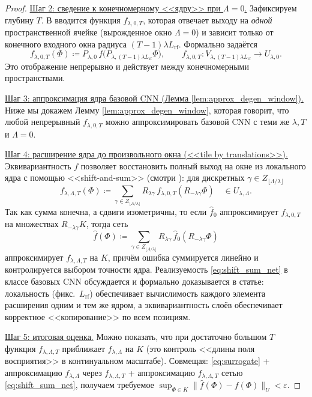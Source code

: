 \documentclass[../NDCNNAI_main.tex]{subfiles}
\begin{document}
\begin{proof}
\underline{Шаг 2: сведение к конечномерному <<ядру>> при $\Lambda=0$.}
Зафиксируем глубину $T$.
В \cite{Yarotsky2018} вводится функция $f_{\lambda,0,T}$, которая отвечает выходу на \emph{одной} пространственной ячейке
(вырожденное окно $\Lambda=0$) и зависит только от конечного входного окна радиуса $(T-1)\lambda L_{\mathrm{rf}}$.
Формально задаётся
\begin{equation}
f_{\lambda,0,T}(\Phi)
\coloneq 
P_{\lambda,0}\,f\!\big(P_{\lambda,(T-1)\lambda L_{\mathrm{rf}}}\Phi\big),
\qquad
f_{\lambda,0,T}:V_{\lambda,(T-1)\lambda L_{\mathrm{rf}}}\to U_{\lambda,0}.
\label{eq:coremap}  
\end{equation}
Это отображение непрерывно и действует между конечномерными пространствами.

\underline{Шаг 3: аппроксимация ядра базовой CNN (Лемма \ref{lem:approx_degen_window}).}
Ниже мы докажем Лемму \ref{lem:approx_degen_window}, которая говорит, что
любой непрерывный $f_{\lambda,0,T}$ можно аппроксимировать базовой CNN с теми же $\lambda,T$ и $\Lambda=0$.

\underline{Шаг 4: расширение ядра до произвольного окна (<<tile by translations>>).}
Эквивариантность $f$ позволяет восстановить полный выход на окне из локального ядра с помощью <<shift-and-sum>>
(смотри \cite[(3.28)]{Yarotsky2018}): для дискретных $\gamma\in Z_{\lfloor \Lambda/\lambda\rfloor}$
\begin{equation}
f_{\lambda,\Lambda,T}(\Phi)
\coloneq 
\sum_{\gamma\in Z_{\lfloor \Lambda/\lambda\rfloor}}
R_{\lambda\gamma}\, f_{\lambda,0,T}(R_{-\lambda\gamma}\Phi)
\quad \in U_{\lambda,\Lambda}.
\label{eq:shift_sum_target}  
\end{equation}
Так как сумма конечна, а сдвиги изометричны, то если $\widehat f_0$ аппроксимирует $f_{\lambda,0,T}$
на множествах $R_{-\lambda\gamma}K$, тогда сеть
\begin{equation}
\widehat f(\Phi)\coloneq \sum_{\gamma\in Z_{\lfloor \Lambda/\lambda\rfloor}}
R_{\lambda\gamma}\,\widehat f_0(R_{-\lambda\gamma}\Phi)
\label{eq:shift_sum_net}  
\end{equation}
аппроксимирует $f_{\lambda,\Lambda,T}$ на $K$, причём ошибка суммируется линейно и контролируется выбором точности ядра.
Реализуемость \eqref{eq:shift_sum_net} в классе базовых CNN обсуждается и формально доказывается в статье:
локальность (фикс.\ $L_{\mathrm{rf}}$) обеспечивает вычислимость каждого элемента расширения одним и тем же ядром,
а эквивариантность слоёв обеспечивает корректное <<копирование>> по всем позициям.

\underline{Шаг 5: итоговая оценка.}
Можно показать, что при достаточно большом $T$ функция $f_{\lambda,\Lambda,T}$ приближает $f_{\lambda,\Lambda}$
на $K$ (это контроль <<длины поля восприятия>> в континуальном масштабе).
Совмещая: \eqref{eq:surrogate} + аппроксимацию $f_{\lambda,\Lambda}$ через $f_{\lambda,\Lambda,T}$ +
аппроксимацию $f_{\lambda,\Lambda,T}$ сетью \eqref{eq:shift_sum_net},
получаем требуемое
$\sup_{\Phi\in K}\|\widehat f(\Phi)-f(\Phi)\|_U<\varepsilon$.  
\end{proof}
\end{document}
